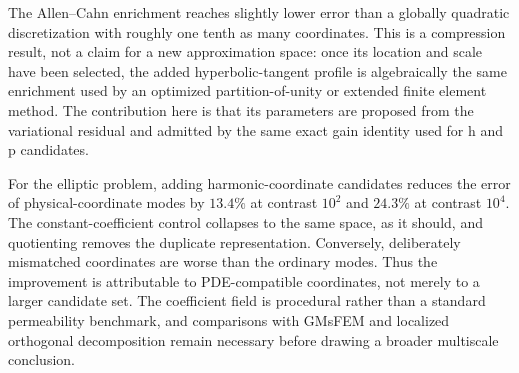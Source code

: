 \documentclass[11pt]{article}
\numberwithin{algorithm}{section}
\theoremstyle{definition}\newtheorem{definition}[theorem]{Definition}
\theoremstyle{remark}\newtheorem{remark}[theorem]{Remark}
\begin{document}
\begin{table}[h]
\centering
\caption{Non-transport controls.  ``Coordinates'' counts the retained scalar
directions.  The Allen--Cahn column reports the energy error against an
independently resolved solution; the elliptic column reports relative energy
error.  All enrichments are selected by the discrete residual and exact
Schur-innovation gain.}
\label{tab:nontransport-controls}
\end{table}

The Allen--Cahn enrichment reaches slightly lower error than a globally
quadratic discretization with roughly one tenth as many coordinates.  This is
a compression result, not a claim for a new approximation space: once its
location and scale have been selected, the added hyperbolic-tangent profile is
algebraically the same enrichment used by an optimized partition-of-unity or
extended finite element method.  The contribution here is that its parameters
are proposed from the variational residual and admitted by the same exact gain
identity used for h and p candidates.

For the elliptic problem, adding harmonic-coordinate candidates reduces the
error of physical-coordinate modes by $13.4\%$ at contrast $10^2$ and $24.3\%$
at contrast $10^4$.  The constant-coefficient control collapses to the same
space, as it should, and quotienting removes the duplicate representation.
Conversely, deliberately mismatched coordinates are worse than the ordinary
modes.  Thus the improvement is attributable to PDE-compatible coordinates,
not merely to a larger candidate set.  The coefficient field is procedural rather
than a standard permeability benchmark, and comparisons with GMsFEM and
localized orthogonal decomposition remain necessary before drawing a broader
multiscale conclusion.
\end{document}
